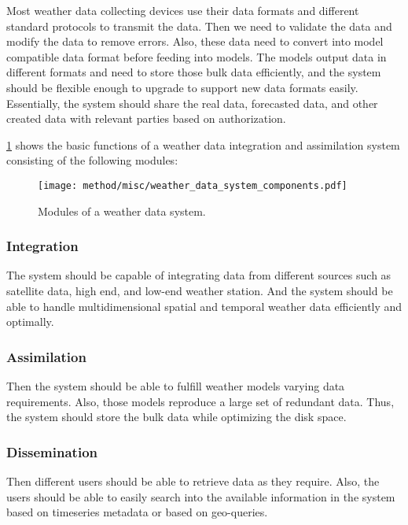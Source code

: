 Most weather data collecting devices use their data formats and different standard protocols to transmit the data. Then we need to validate the data and modify the data to remove errors. Also, these data need to convert into model compatible data format before feeding into models. The models output data in different formats and need to store those bulk data efficiently, and the system should be flexible enough to upgrade to support new data formats easily. Essentially, the system should share the real data, forecasted data, and other created data with relevant parties based on authorization.



\cref{fi:wdia_components} shows the basic functions of a weather data integration and assimilation system consisting of the following modules: 

\begin{figure}[htbp]
\centerline{\texttt{[image: method/misc/weather\_data\_system\_components.pdf]}}
\caption{Modules of a weather data system.}
\label{fi:wdia_components}
\end{figure}

\subsubsection{Integration }
The system should be capable of integrating data from different sources such as satellite data, high end, and low-end weather station. And the system should be able to handle multidimensional spatial and temporal weather data efficiently and optimally.
\subsubsection{Assimilation}
Then the system should be able to fulfill weather models varying data requirements. Also, those models reproduce a large set of redundant data. Thus, the system should store the bulk data while optimizing the disk space.
\subsubsection{Dissemination}
Then different users should be able to retrieve data as they require. Also, the users should be able to easily search into the available information in the system based on timeseries metadata or based on geo-queries.
